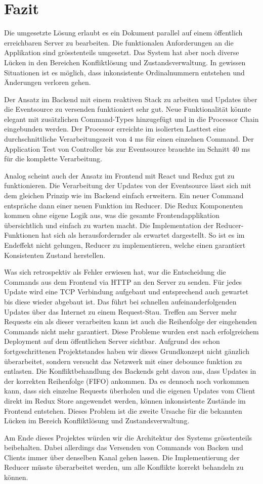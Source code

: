 \section{Fazit}

Die umgesetzte Lösung erlaubt es ein Dokument parallel auf einem öffentlich erreichbaren Server zu bearbeiten.
Die funktionalen Anforderungen an die Applikation sind grösstenteils umgesetzt.
Das System hat aber noch diverse Lücken in den Bereichen Konfliktlösung und Zustandsverwaltung.
In gewissen Situationen ist es möglich, dass inkonsistente Ordinalnummern entstehen und Änderungen verloren gehen.

Der Ansatz im Backend mit einem reaktiven Stack zu arbeiten und Updates über die Eventsource zu versenden funktioniert sehr gut.
Neue Funktionalität könnte elegant mit zusätzlichen Command-Types hinzugefügt und in die Processor Chain eingebunden werden.
Der Processor erreichte im isolierten Lasttest eine durchschnittliche Verarbeitungszeit von 4 ms für einen einzelnen Command.
Der Application Test von Controller bis zur Eventsource brauchte im Schnitt 40 ms für die komplette Verarbeitung.

Analog scheint auch der Ansatz im Frontend mit React und Redux gut zu funktionieren.
Die Verarbeitung der Updates von der Eventsource lässt sich mit dem gleichen Prinzip wie im Backend einfach erweitern.
Ein neuer Command entspräche dann einer neuen Funktion im Reducer.
Die Redux Komponenten kommen ohne eigene Logik aus, was die gesamte Frontendapplikation übersichtlich und einfach zu warten macht.
Die Implementation der Reducer-Funktionen hat sich als herausfordernder als erwartet dargestellt.
So ist es im Endeffekt nicht gelungen, Reducer zu implementieren, welche einen garantiert Konsistenten Zustand herstellen.

Was sich retrospektiv als Fehler erwiesen hat, war die Entscheidung die Commands aus dem Frontend via HTTP an den Server zu senden.
Für jedes Update wird eine TCP Verbindung aufgebaut und entsprechend auch gewartet bis diese wieder abgebaut ist.
Das führt bei schnellen aufeinanderfolgenden Updates über das Internet zu einem Request-Stau.
Treffen am Server mehr Requests ein als dieser verarbeiten kann ist auch die Reihenfolge der eingehenden Commands nicht mehr garantiert.
Diese Probleme wurden erst nach erfolgreichem Deployment auf dem öffentlichen Server sichtbar.
Aufgrund des schon fortgeschrittenen Projektstandes haben wir dieses Grundkonzept nicht gänzlich überarbeitet, sondern versucht das Netzwerk mit einer debounce funktion zu entlasten.
Die Konfliktbehandlung des Backends geht davon aus, dass Updates in der korrekten Reihenfolge (FIFO) ankommen.
Da es dennoch noch vorkommen kann, dass sich einzelne Requests überholen und die eigenen Updates vom Client direkt im Redux Store angewendet werden, können inkonsistente Zustände im Frontend entstehen.
Dieses Problem ist die zweite Ursache für die bekannten Lücken im Bereich Konfliktlösung und Zustandsverwaltung.

Am Ende dieses Projektes würden wir die Architektur des Systems grösstenteils beibehalten.
Dabei allerdings das Versenden von Commands von Backen und Clients immer über denselben Kanal gehen lassen.
Die Implementierung der Reducer müsste überarbeitet werden, um alle Konflikte korrekt behandeln zu können.

